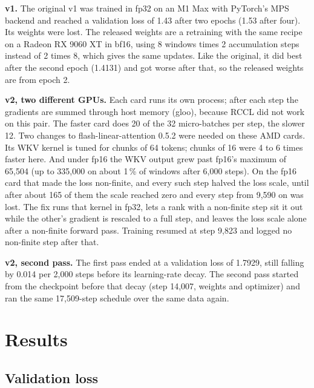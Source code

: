 \documentclass[11pt,a4paper]{article}
\begin{document}
\textbf{v1.} The original v1 was trained in fp32 on an M1 Max with PyTorch's MPS backend and reached a
validation loss of 1.43 after two epochs (1.53 after four). Its weights were lost. The released weights are a
retraining with the same recipe on a Radeon RX 9060 XT in bf16, using 8 windows times 2 accumulation steps
instead of 2 times 8, which gives the same updates. Like the original, it did best after the second
epoch (1.4131) and got worse after that, so the released weights are from epoch 2.

\textbf{v2, two different GPUs.} Each card runs its own process; after each step the gradients are summed
through host memory (gloo), because RCCL did not work on this pair. The faster card does 20 of the 32
micro-batches per step, the slower 12. Two changes to flash-linear-attention 0.5.2 \cite{fla} were needed on
these AMD cards. Its WKV kernel is tuned for chunks of 64 tokens; chunks of 16 were 4 to 6 times faster here.
And under fp16 the WKV output grew past fp16's maximum of 65,504 (up to 335,000 on about 1\,\% of windows after
6,000 steps). On the fp16 card that made the loss non-finite, and every such step halved the loss scale, until
after about 165 of them the scale reached zero and every step from 9,590 on was lost. The fix runs that kernel in
fp32, lets a rank with a non-finite step sit it out while the other's gradient is rescaled to a full step, and
leaves the loss scale alone after a non-finite forward pass. Training resumed at step 9,823 and logged no
non-finite step after that.

\textbf{v2, second pass.} The first pass ended at a validation loss of 1.7929, still falling by 0.014 per 2,000
steps before its learning-rate decay. The second pass started from the checkpoint before that decay (step 14,007,
weights and optimizer) and ran the same 17,509-step schedule over the same data again.

\section{Results}

\subsection{Validation loss}
\end{document}
